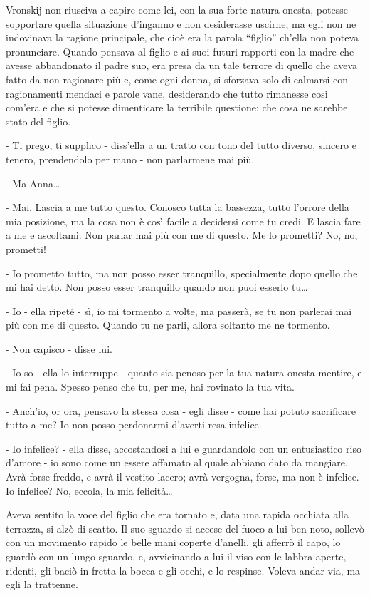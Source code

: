 Vronskij non riusciva a capire come lei, con la sua forte natura onesta, potesse sopportare quella situazione d'inganno e non desiderasse uscirne; ma egli non ne indovinava la ragione principale, che cioè era la parola ``figlio'' ch'ella non poteva pronunciare. Quando pensava al figlio e ai suoi futuri rapporti con la madre che avesse abbandonato il padre suo, era presa da un tale terrore di quello che aveva fatto da non ragionare più e, come ogni donna, si sforzava solo di calmarsi con ragionamenti mendaci e parole vane, desiderando che tutto rimanesse così com'era e che si potesse dimenticare la terribile questione: che cosa ne sarebbe stato del figlio. 

- Ti prego, ti supplico - diss'ella a un tratto con tono del tutto diverso, sincero e tenero, prendendolo per mano - non parlarmene mai più. 

- Ma Anna\ldots{} 

- Mai. Lascia a me tutto questo. Conosco tutta la bassezza, tutto l'orrore della mia posizione, ma la cosa non è così facile a decidersi come tu credi. E lascia fare a me e ascoltami. Non parlar mai più con me di questo. Me lo prometti? No, no, prometti! 

- Io prometto tutto, ma non posso esser tranquillo, specialmente dopo quello che mi hai detto. Non posso esser tranquillo quando non puoi esserlo tu\ldots{} 

- Io - ella ripeté - sì, io mi tormento a volte, ma passerà, se tu non parlerai mai più con me di questo. Quando tu ne parli, allora soltanto me ne tormento. 

- Non capisco - disse lui. 

- Io so - ella lo interruppe - quanto sia penoso per la tua natura onesta mentire, e mi fai pena. Spesso penso che tu, per me, hai rovinato la tua vita. 

- Anch'io, or ora, pensavo la stessa cosa - egli disse - come hai potuto sacrificare tutto a me? Io non posso perdonarmi d'averti resa infelice. 

- Io infelice? - ella disse, accostandosi a lui e guardandolo con un entusiastico riso d'amore - io sono come un essere affamato al quale abbiano dato da mangiare. Avrà forse freddo, e avrà il vestito lacero; avrà vergogna, forse, ma non è infelice. Io infelice? No, eccola, la mia felicità\ldots{} 

Aveva sentito la voce del figlio che era tornato e, data una rapida occhiata alla terrazza, si alzò di scatto. Il suo sguardo si accese del fuoco a lui ben noto, sollevò con un movimento rapido le belle mani coperte d'anelli, gli afferrò il capo, lo guardò con un lungo sguardo, e, avvicinando a lui il viso con le labbra aperte, ridenti, gli baciò in fretta la bocca e gli occhi, e lo respinse. Voleva andar via, ma egli la trattenne. 

